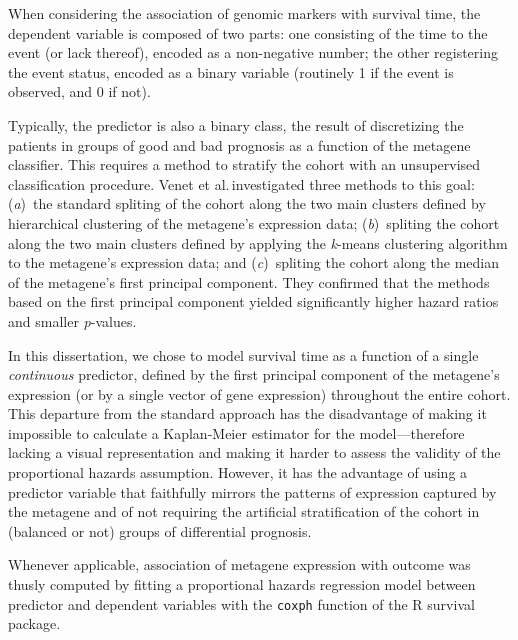 When considering the association of genomic markers with survival time, the
dependent variable is composed of two parts: one consisting of the time to the
event (or lack thereof), encoded as a non-negative number; the other registering
the event status, encoded as a binary variable (routinely 1 if the event is
observed, and 0 if not).

Typically, the predictor is also a binary class, the result of discretizing the
patients in groups of good and bad prognosis as a function of the metagene
classifier.  This requires a method to stratify the cohort with an unsupervised
classification procedure.  Venet et al.\cite{venet_most_2011}\,investigated
three methods to this goal: (\emph{a})~the standard spliting of the cohort along
the two main clusters defined by hierarchical clustering of the metagene's
expression data;
(\emph{b})~spliting the cohort along the two main clusters defined
by applying the \emph{k}-means clustering algorithm to the metagene's expression
data;
and (\emph{c})~spliting the cohort along the median of the metagene's first
principal component.
They confirmed that the methods based on the first principal
component %
yielded significantly higher hazard ratios and smaller \emph{p}-values.

In this dissertation, we chose to model survival time as a function of a single
\emph{continuous} predictor, defined by the first principal component of the
metagene's expression (or by a single vector of gene expression) throughout the
entire cohort.  This departure from the standard approach has the disadvantage
of making it impossible to calculate a Kaplan-Meier estimator for the
model---therefore lacking a visual representation and making it harder to assess
the validity of the proportional hazards assumption.  However, it has the
advantage of using a predictor variable that faithfully mirrors the patterns of
expression captured by the metagene and of not requiring the artificial
stratification of the cohort in (balanced or not) groups of differential
prognosis.

Whenever applicable, association of metagene expression with outcome was thusly
computed by fitting a proportional hazards regression model between predictor
and dependent variables with the \texttt{coxph} function of the \textsf{R}
\textsf{survival} package.


